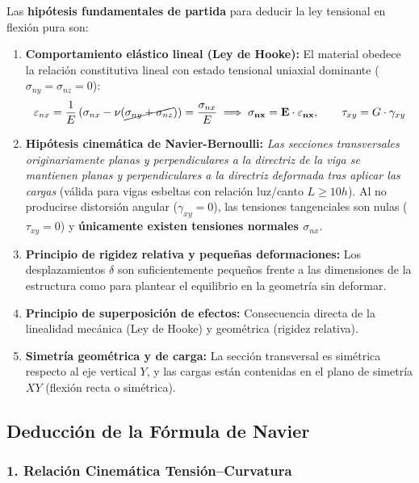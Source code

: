 Las \textbf{hipótesis fundamentales de partida} para deducir la ley tensional en flexión pura son:
\begin{enumerate}
    \item \textbf{Comportamiento elástico lineal (Ley de Hooke):} El material obedece la relación constitutiva lineal con estado tensional uniaxial dominante ($\sigma_{ny} = \sigma_{nz} = 0$):
          \begin{equation}
              \varepsilon_{nx} = \frac{1}{E}\left(\sigma_{nx} - \nu(\cancel{\sigma_{ny} + \sigma_{nz}})\right) = \frac{\sigma_{nx}}{E} \implies \mathbf{\sigma_{nx} = E \cdot \varepsilon_{nx}}, \qquad \tau_{xy} = G \cdot \gamma_{xy}
          \end{equation}
    \item \textbf{Hipótesis cinemática de Navier-Bernoulli:} \textit{Las secciones transversales originariamente planas y perpendiculares a la directriz de la viga se mantienen planas y perpendiculares a la directriz deformada tras aplicar las cargas} (válida para vigas esbeltas con relación luz/canto $L \ge 10 h$).
          Al no producirse distorsión angular ($\gamma_{xy} = 0$), las tensiones tangenciales son nulas ($\tau_{xy} = 0$) y \textbf{únicamente existen tensiones normales $\sigma_{nx}$}.
    \item \textbf{Principio de rigidez relativa y pequeñas deformaciones:} Los desplazamientos $\delta$ son suficientemente pequeños frente a las dimensiones de la estructura como para plantear el equilibrio en la geometría sin deformar.
    \item \textbf{Principio de superposición de efectos:} Consecuencia directa de la linealidad mecánica (Ley de Hooke) y geométrica (rigidez relativa).
    \item \textbf{Simetría geométrica y de carga:} La sección transversal es simétrica respecto al eje vertical $Y$, y las cargas están contenidas en el plano de simetría $XY$ (flexión recta o simétrica).
\end{enumerate}

\subsection{Deducción de la Fórmula de Navier}

\subsubsection{1. Relación Cinemática Tensión--Curvatura}

